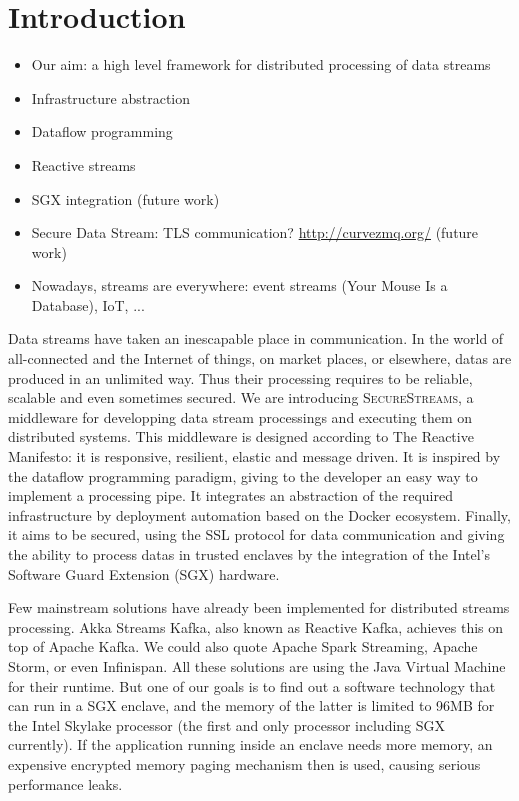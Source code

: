 \section{Introduction}
\label{sec:introduction}

\begin{itemize}
  \item Our aim: a high level framework for distributed processing of data streams
  \item Infrastructure abstraction
  \item Dataflow programming
  \item Reactive streams
  \item SGX integration (future work)
  \item Secure Data Stream: TLS communication? \url{http://curvezmq.org/} (future work)
  \item Nowadays, streams are everywhere: event streams (Your Mouse Is a Database), IoT, ...
\end{itemize}

Data streams have taken an inescapable place in communication.
In the world of all-connected and the Internet of things, on market places, or elsewhere, datas are produced in an unlimited way.
Thus their processing requires to be reliable, scalable and even sometimes secured.
We are introducing \textsc{SecureStreams}, a middleware for developping data stream processings and executing them on distributed systems.
This middleware is designed according to The Reactive Manifesto: it is responsive, resilient, elastic and message driven\cite{reactivemanifesto}.
It is inspired by the dataflow programming paradigm, giving to the developer an easy way to implement a processing pipe.
It integrates an abstraction of the required infrastructure by deployment automation based on the Docker ecosystem.
Finally, it aims to be secured, using the SSL protocol for data communication and giving the ability to process datas in trusted enclaves by the integration of the Intel's Software Guard Extension (SGX) hardware.

Few mainstream solutions have already been implemented for distributed streams processing.
Akka Streams Kafka, also known as Reactive Kafka\cite{reactivekafka}, achieves this on top of Apache Kafka\cite{apachekafka}.
We could also quote  Apache Spark Streaming\cite{apachesparkstreaming}, Apache Storm\cite{apachestorm}, or even Infinispan\cite{infinispan}.
All these solutions are using the Java Virtual Machine for their runtime.
But one of our goals is to find out a software technology that can run in a SGX enclave, and the memory of the latter is limited to 96MB for the Intel Skylake processor (the first and only processor including SGX currently)\cite{intelsgxexplained}.
If the application running inside an enclave needs more memory, an expensive encrypted memory paging mechanism then is used, causing serious performance leaks\cite{SecureKeeper}.
